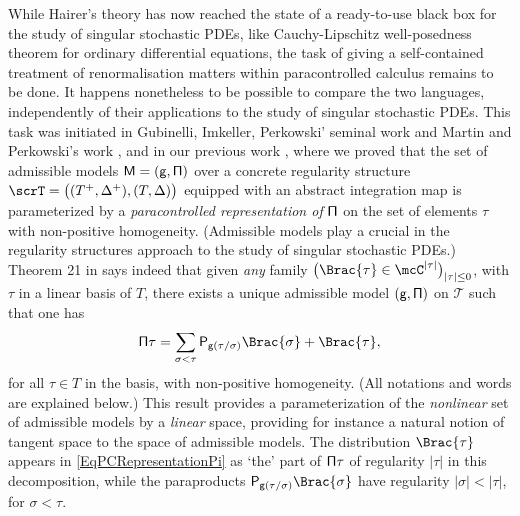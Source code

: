 While Hairer's theory has now reached the state of a ready-to-use black box for the study of singular stochastic PDEs, like Cauchy-Lipschitz well-posedness theorem for ordinary differential equations, the task of giving a self-contained treatment of renormalisation matters within paracontrolled calculus remains to be done. It happens nonetheless to be possible to compare the two languages, independently of their applications to the study of singular stochastic PDEs. This task was initiated in Gubinelli, Imkeller, Perkowski' seminal work \cite{GIP} and Martin and Perkowski's work \cite{MP18}, and in our previous work \cite{BH}, where we proved that the set of admissible models $\sf M=(g,\Pi)$ over a concrete regularity structure $\scrT=\bigl((T^+,\Delta^+), (T,\Delta)\bigr)$ equipped with an abstract integration map is parameterized by a \emph{paracontrolled representation of} $\sf \Pi$ on the set of elements $\tau$ with non-positive homogeneity. (Admissible models play a crucial in the regularity structures approach to the study of singular stochastic PDEs.) Theorem 21 in \cite{BH} says indeed that given \emph{any} family $\bigl(\Brac{\tau}\in\mcC^{\vert\tau\vert}\bigr)_{\vert\tau\vert\leq 0}$, with $\tau$ in a linear basis of $T$, there exists a unique admissible model $\sf (g,\Pi)$ on $\mathscr{T}$ such that one has
\begin{equation} \label{EqPCRepresentationPi}
{\sf \Pi} \tau = \sum_{\sigma<\tau} {\sf P}_{{\sf g}(\tau/\sigma)}\Brac{\sigma} + \Brac{\tau},
\end{equation}
for all $\tau\in T$ in the basis, with non-positive homogeneity. (All notations and words are explained below.) This result provides a parameterization of the \emph{nonlinear} set of admissible models by a \emph{linear} space, providing for instance a natural notion of tangent space to the space of admissible models. The distribution $\Brac{\tau}$ appears in \eqref{EqPCRepresentationPi} as `the' part of ${\sf\Pi}\tau$ of regularity $\vert\tau\vert$ in this decomposition, while the paraproducts ${\sf P}_{{\sf g}(\tau/\sigma)}\Brac{\sigma}$ have regularity $\vert\sigma\vert<\vert\tau\vert$, for $\sigma<\tau$.

